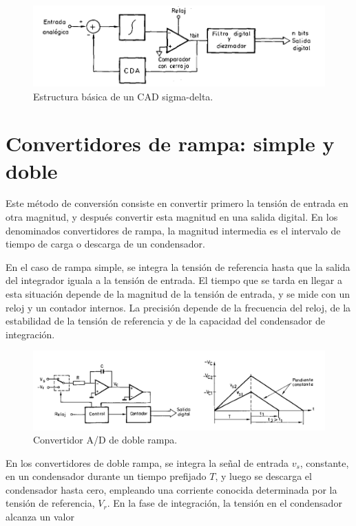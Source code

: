 \begin{figure}[H]
    \centering
    \includegraphics[width=0.75\linewidth]{Imagenes/Convertidores sigma delta.png}
    \caption{Estructura básica de un CAD sigma-delta.}
\end{figure}

\section{Convertidores de rampa: simple y doble}
Este método de conversión consiste en convertir primero la tensión de entrada en otra magnitud, y después convertir esta magnitud en una salida digital. En los denominados convertidores de rampa, la magnitud intermedia es el intervalo de tiempo de carga o descarga de un condensador.

En el caso de rampa simple, se integra la tensión de referencia hasta que la salida del integrador iguala a la tensión de entrada. El tiempo que se tarda en llegar a esta situación depende de la magnitud de la tensión de entrada, y se mide con un reloj y un contador internos. La precisión depende de la frecuencia del reloj, de la estabilidad de la tensión de referencia y de la capacidad del condensador de integración.

\begin{figure}[H]
    \centering
    \includegraphics[width=0.75\linewidth]{Imagenes/Convertidor Doble Rampa.png}
    \caption{Convertidor A/D de doble rampa.}
\end{figure}

En los convertidores de doble rampa, se integra la señal de entrada $v_s$, constante, en un condensador durante un tiempo prefijado $T$, y luego se descarga el condensador hasta cero, empleando una corriente conocida determinada por la tensión de referencia, $V_r$. En la fase de integración, la tensión en el condensador alcanza un valor

